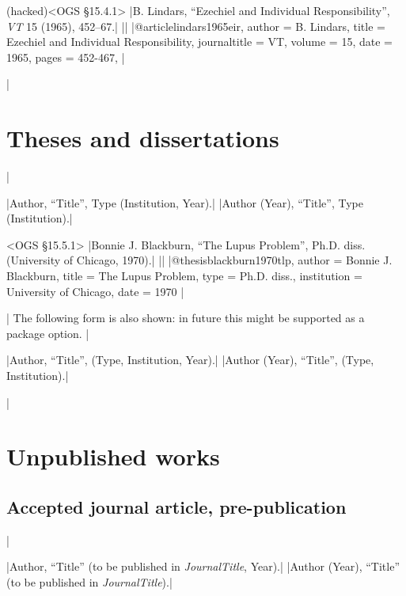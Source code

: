 \documentclass[extrafontsizes,11pt,a4paper,oneside]{memoir}
\newcommand*{\lit}[1]{\textsf{#1}}
\begin{document}
\bibexample(hacked)<OGS \S15.4.1>
|B. Lindars, \enquote{Ezechiel and Individual Responsibility}, \emph{VT} 15 (1965), 452--67.|%
||%
|@article{lindars1965eir,
  author = {B. Lindars},
  title = {Ezechiel and Individual Responsibility},
  journaltitle = {VT\nopunct},
  volume = {15},
  date = {1965},
  pages = {452-467},
}|

\todoc|
\chapter{Theses and dissertations}\label{sec:thesis}
|

\specs
|Author, \enquote{Title}, Type (Institution, Year).|%
|Author (Year), \enquote{Title}, Type (Institution).|

\bibexample<OGS \S15.5.1>
|Bonnie J. Blackburn, \enquote{The Lupus Problem}, Ph.D. diss. (University of Chicago, 1970).|%
||%
|@thesis{blackburn1970tlp,
  author = {Bonnie J. Blackburn},
  title = {The Lupus Problem},
  type = {Ph.D. diss.},
  institution = {University of Chicago},
  date = {1970}
}|

\todoc|
The following form is also shown: in future this might be supported as a package option.
|

\specs
|Author, \enquote{Title}, (Type, Institution, Year).|%
|Author (Year), \enquote{Title}, (Type, Institution).|


\todoc|
\chapter{Unpublished works}\label{sec:unpublished}

\section{Accepted journal article, pre-publication}
|

\specs
|Author, \enquote{Title} (\lit{to be published in} \emph{JournalTitle}, Year).|%
|Author (Year), \enquote{Title} (\lit{to be published in} \emph{JournalTitle}).|
\end{document}
